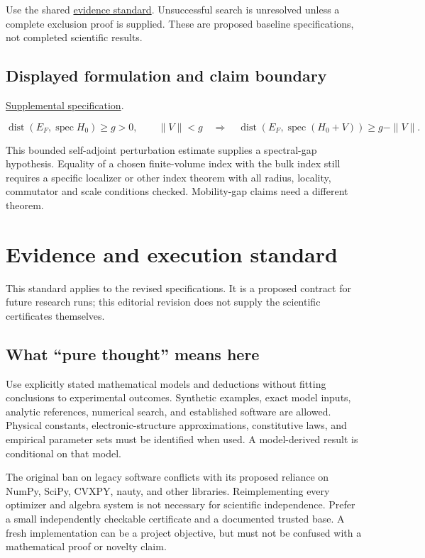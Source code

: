 \documentclass[
  11pt,
]{article}
\begin{document}
Use the shared
\href{https://github.com/rick-stevens-ai/Pure-Thought/blob/main/reviews/EVIDENCE-STANDARD.md}{evidence
standard}. Unsuccessful search is unresolved unless a complete exclusion
proof is supplied. These are proposed baseline specifications, not
completed scientific results.

\subsection{Displayed formulation and claim boundary}

\href{https://github.com/rick-stevens-ai/Pure-Thought/blob/main/supplemental/S04.md}{Supplemental
specification}.

\[\operatorname{dist}(E_F,\operatorname{spec}H_0)\ge g>0,
\qquad\|V\|<g\quad\Longrightarrow\quad
\operatorname{dist}(E_F,\operatorname{spec}(H_0+V))\ge g-\|V\|.\]

This bounded self-adjoint perturbation estimate supplies a spectral-gap
hypothesis. Equality of a chosen finite-volume index with the bulk index
still requires a specific localizer or other index theorem with all
radius, locality, commutator and scale conditions checked. Mobility-gap
claims need a different theorem.

\section{Evidence and execution standard}

This standard applies to the revised specifications. It is a proposed
contract for future research runs; this editorial revision does not
supply the scientific certificates themselves.

\subsection{What ``pure thought'' means here}

Use explicitly stated mathematical models and deductions without fitting
conclusions to experimental outcomes. Synthetic examples, exact model
inputs, analytic references, numerical search, and established software
are allowed. Physical constants, electronic-structure approximations,
constitutive laws, and empirical parameter sets must be identified when
used. A model-derived result is conditional on that model.

The original ban on legacy software conflicts with its proposed reliance
on NumPy, SciPy, CVXPY, nauty, and other libraries. Reimplementing every
optimizer and algebra system is not necessary for scientific
independence. Prefer a small independently checkable certificate and a
documented trusted base. A fresh implementation can be a project
objective, but must not be confused with a mathematical proof or novelty
claim.
\end{document}
